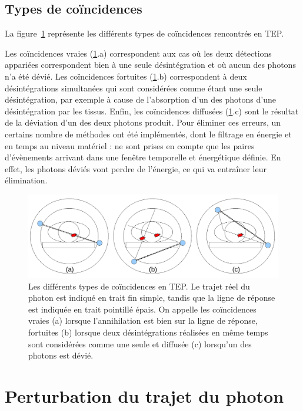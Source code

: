 	\subsection{Types de coïncidences}

La figure~\ref{fig:schemaDetections} représente les différents types de coïncidences rencontrés en TEP.

Les coïncidences vraies (\ref{fig:schemaDetections}.a) correspondent aux cas où les deux détections appariées correspondent bien à une seule désintégration et où aucun des photons n'a été dévié. Les coïncidences fortuites (\ref{fig:schemaDetections}.b) correspondent à deux désintégrations simultanées qui sont considérées comme étant une seule désintégration, par exemple à cause de l’absorption d’un des photons d’une désintégration par les tissus. Enfin, les coïncidences diffusées (\ref{fig:schemaDetections}.c) sont le résultat de la déviation d'un des deux photons produit. Pour éliminer ces erreurs, un certains nombre de méthodes ont été implémentés, dont le filtrage en énergie et en temps au niveau matériel : ne sont prises en compte que les paires d'évènements arrivant dans une fenêtre temporelle et énergétique définie. En effet, les photons déviés vont perdre de l'énergie, ce qui va entraîner leur élimination.

\begin{figure}
\centering
\includegraphics[width=12cm]{images/schemaDetections}
\caption[Les différents types de coïncidences en TEP]{Les différents types de coïncidences en TEP. Le trajet réel du photon est indiqué en trait fin simple, tandis que la ligne de réponse est indiquée en trait pointillé épais. On appelle les coïncidences vraies (a) lorsque l'annihilation est bien sur la ligne de réponse, fortuites (b) lorsque deux désintégrations réalisées en même temps sont considérées comme une seule et diffusée (c) lorsqu'un des photons est dévié.}
\label{fig:schemaDetections}
\end{figure}



	\section{Perturbation du trajet du photon}

